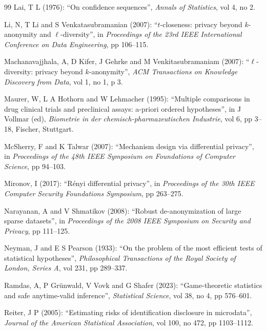 \documentclass[11pt,a4paper]{article}
\theoremstyle{plain}
\theoremstyle{definition}
\theoremstyle{definition}
\theoremstyle{plain}
\begin{document}
\begin{thebibliography}{99}
Lai, T L (1976): ``On confidence sequences'', \emph{Annals of Statistics}, vol 4, no 2.

Li, N, T Li and S Venkatasubramanian (2007): ``$t$-closeness: privacy beyond $k$-anonymity and $\ell$-diversity'', in \emph{Proceedings of the 23rd IEEE International Conference on Data Engineering}, pp 106--115.

Machanavajjhala, A, D Kifer, J Gehrke and M Venkitasubramaniam (2007): ``$\ell$-diversity: privacy beyond $k$-anonymity'', \emph{ACM Transactions on Knowledge Discovery from Data}, vol 1, no 1, p 3.

Maurer, W, L A Hothorn and W Lehmacher (1995): ``Multiple comparisons in drug clinical trials and preclinical assays: a-priori ordered hypotheses'', in J Vollmar (ed), \emph{Biometrie in der chemisch-pharmazeutischen Industrie}, vol 6, pp 3--18, Fischer, Stuttgart.

McSherry, F and K Talwar (2007): ``Mechanism design via differential privacy'', in \emph{Proceedings of the 48th IEEE Symposium on Foundations of Computer Science}, pp 94--103.

Mironov, I (2017): ``R\'enyi differential privacy'', in \emph{Proceedings of the 30th IEEE Computer Security Foundations Symposium}, pp 263--275.

Narayanan, A and V Shmatikov (2008): ``Robust de-anonymization of large sparse datasets'', in \emph{Proceedings of the 2008 IEEE Symposium on Security and Privacy}, pp 111--125.

Neyman, J and E S Pearson (1933): ``On the problem of the most efficient tests of statistical hypotheses'', \emph{Philosophical Transactions of the Royal Society of London, Series A}, vol 231, pp 289--337.

Ramdas, A, P Gr\"unwald, V Vovk and G Shafer (2023): ``Game-theoretic statistics and safe anytime-valid inference'', \emph{Statistical Science}, vol 38, no 4, pp 576--601.

Reiter, J P (2005): ``Estimating risks of identification disclosure in microdata'', \emph{Journal of the American Statistical Association}, vol 100, no 472, pp 1103--1112.


\end{thebibliography}
\end{document}
